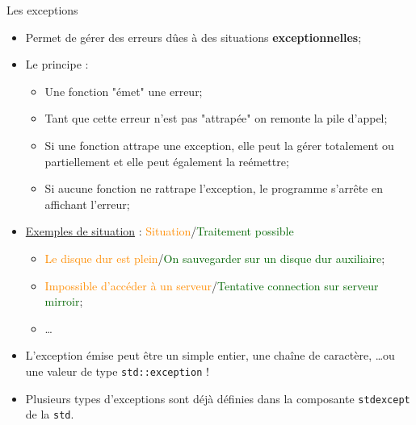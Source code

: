 \documentclass[compress,10pt,aspectratio=169]{beamer}
\begin{document}
\begin{frame}[fragile]{Les exceptions}
  \scriptsize
  \begin{itemize}
  \item Permet de gérer des erreurs dûes à des situations \textbf{exceptionnelles};
  \item Le principe :
  \begin{itemize}
  \scriptsize
  \item Une fonction "émet" une erreur;
  \item Tant que cette erreur n'est pas "attrapée" on remonte la pile d'appel;
  \item Si une fonction attrape une exception, elle peut la gérer totalement ou partiellement et elle peut également la reémettre;
  \item Si aucune fonction ne rattrape l'exception, le programme s'arrête en affichant l'erreur;
  \end{itemize}
  \item \underline{Exemples de situation} : \textcolor{darkorange}{Situation}/\textcolor{DarkGreen}{Traitement possible}
  \begin{itemize}
  \scriptsize
  \item \textcolor{darkorange}{Le disque dur est plein}/\textcolor{DarkGreen}{On sauvegarder sur un disque dur auxiliaire};
  \item \textcolor{darkorange}{Impossible d'accéder à un serveur}/\textcolor{DarkGreen}{Tentative connection sur serveur mirroir};
  \item \ldots
  \end{itemize}
  \item L'exception émise peut être un simple entier, une chaîne de caractère, \ldots ou une valeur de type \texttt{std::exception} !
  \item Plusieurs types d'exceptions sont déjà définies dans la composante \texttt{stdexcept} de la \texttt{std}.
  \end{itemize}
\end{frame}
\end{document}
